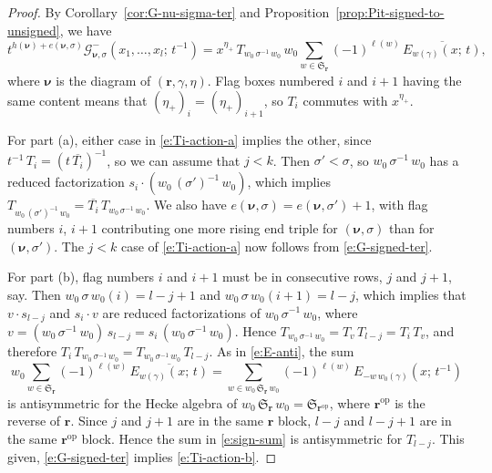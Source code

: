 \documentclass[12pt]{amsart}
\theoremstyle{definition}
\theoremstyle{remark}
\newcommand{\rr}{{\mathbf r}}
\newcommand{\nubold}{{\boldsymbol \nu }}
\newcommand{\Sfrak}{{\mathfrak S}}
\newcommand{\Gcal}{{\mathcal G}}
\DeclareMathOperator{\op}{op}
\begin{document}
\begin{proof}
By Corollary~\ref{cor:G-nu-sigma-ter} and
Proposition~\ref{prop:Pit-signed-to-unsigned}, we have
\begin{equation}\label{e:G-signed-ter}
t^{h(\nubold )+e(\nubold ,\sigma )} \Gcal _{\nubold ,\sigma
}^{-}(x_{1},\ldots,x_{l};\, t^{-1}) = x^{\eta _{+}}\, T_{w_{0}\,
\sigma ^{-1} \, w_{0}}\, w_{0} \sum _{w\in \Sfrak _{\rr }} (-1)^{\ell
(w)} \, \overline{E_{w(\gamma )}(x;\, t)},
\end{equation}
where $\nubold $ is the diagram of $(\rr ,\gamma, \eta )$.  Flag boxes
numbered $i$ and $i+1$ having the same content means that $(\eta
_{+})_{i} = (\eta _{+})_{i+1}$, so $T_{i}$ commutes with $x^{\eta
_{+}}$.

For part (a), either case in \eqref{e:Ti-action-a} implies the other,
since $t^{-1}\, T_{i} = (t\, \overline{T_{i}})^{-1}$, so we can assume
that $j<k$.  Then $\sigma '<\sigma $, so $w_{0}\, \sigma ^{-1}\,
w_{0}$ has a reduced factorization $s_{i}\cdot (w_{0}\, (\sigma
')^{-1}\, w_{0})$, which implies $T_{w_{0}\, (\sigma' )^{-1}\, w_{0}}
= \overline{T_{i}}\, T_{w_{0}\, \sigma ^{-1}\, w_{0}}$.  We also have
$e(\nubold ,\sigma ) = e(\nubold ,\sigma ') + 1$, with flag numbers
$i$, $i+1$ contributing one more rising end triple for $(\nubold
,\sigma )$ than for $(\nubold ,\sigma ')$.  The $j<k$ case of
\eqref{e:Ti-action-a} now follows from \eqref{e:G-signed-ter}.

For part (b), flag numbers $i$ and $i+1$ must be in consecutive rows,
$j$ and $j+1$, say.  Then $w_{0}\, \sigma\, w_{0}(i)=l - j+1$ and
$w_{0}\, \sigma\, w_{0}(i+1)=l-j$, which implies that $v\cdot s_{l-j}$
and $s_{i}\cdot v$ are reduced factorizations of $w_{0}\, \sigma
^{-1}\, w_{0}$, where $v = (w_{0}\, \sigma ^{-1}\, w_{0})\, s_{l-j} =
s_{i}\, (w_{0}\, \sigma ^{-1}\, w_{0})$.  Hence $T_{w_{0}\, \sigma
^{-1}\, w_{0}} = T_{v} \, T_{l-j} = T_{i}\, T_{v}$, and therefore
$T_{i}\, T_{w_{0}\, \sigma ^{-1}\, w_{0}} = T_{w_{0}\, \sigma ^{-1}\,
w_{0}}\, T_{l-j}$.  As in \eqref{e:E-anti}, the sum
\begin{equation}\label{e:sign-sum}
w_{0} \sum _{w\in \Sfrak _{\rr }} (-1)^{\ell (w)} \,
\overline{E_{w(\gamma )}(x;\, t)} = \sum _{w\in w_{0}\, \Sfrak _{\rr }\,
w_{0}} (-1)^{\ell (w)} \, E_{-w \, w_{0}(\gamma )}(x;\, t^{-1})
\end{equation}
is antisymmetric for the Hecke algebra of $w_{0}\, \Sfrak _{\rr }\,
w_{0} = \Sfrak _{\rr ^{\op }}$, where $\rr ^{\op}$ is the reverse of
$\rr $.  Since $j$ and $j+1$ are in the same $\rr $ block, $l-j$ and
$l-j+1$ are in the same $\rr ^{\op }$ block.  Hence the sum in
\eqref{e:sign-sum} is antisymmetric for $T_{l-j}$.  This given,
\eqref{e:G-signed-ter} implies \eqref{e:Ti-action-b}.
\end{proof}
\end{document}
